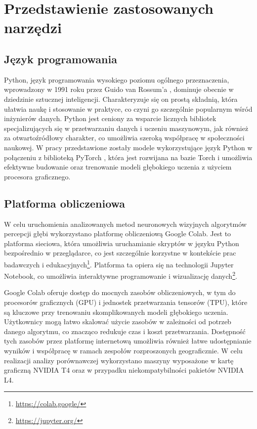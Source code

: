 \chapter{Przedstawienie zastosowanych narzędzi}\label{chap:przedstawienie_zastosowanych_narzędzi}

\section{Język programowania}
Python, język programowania wysokiego poziomu ogólnego przeznaczenia, wprowadzony w 1991 roku przez Guido van Rossum’a \cite{Python}, dominuje obecnie w dziedzinie sztucznej inteligencji. Charakteryzuje się on prostą składnią, która ułatwia naukę i stosowanie w praktyce, co czyni go szczególnie popularnym wśród inżynierów danych. Python jest ceniony za wsparcie licznych bibliotek specjalizujących się w przetwarzaniu danych i uczeniu maszynowym, jak również za otwartoźródłowy charakter, co umożliwia szeroką współpracę w społeczności naukowej. W pracy przedstawione zostały modele wykorzystujące język Python w połączeniu z biblioteką PyTorch \cite{paszke2019}, która jest rozwijana na bazie Torch i umożliwia efektywne budowanie oraz trenowanie modeli głębokiego uczenia z użyciem procesora graficznego.

\section{Platforma obliczeniowa}
W celu uruchomienia analizowanych metod neuronowych wizyjnych algorytmów percepcji głębi wykorzystano platformę obliczeniową Google Colab. Jest to platforma sieciowa, która umożliwia uruchamianie skryptów w języku Python bezpośrednio w przeglądarce, co jest szczególnie korzystne w kontekście prac badawczych i edukacyjnych\footnote{\href{https://colab.google/}{https://colab.google/}}. Platforma ta opiera się na technologii Jupyter Notebook, co umożliwia interaktywne programowanie i wizualizację danych\footnote{\href{https://jupyter.org/}{https://jupyter.org/}}.

Google Colab oferuje dostęp do mocnych zasobów obliczeniowych, w tym do procesorów graficznych (GPU) i jednostek przetwarzania tensorów (TPU), które są kluczowe przy trenowaniu skomplikowanych modeli głębokiego uczenia. Użytkownicy mogą łatwo skalować użycie zasobów w zależności od potrzeb danego algorytmu, co znacząco redukuje czas i koszt przetwarzania. Dostępność tych zasobów przez platformę internetową umożliwia również łatwe udostępnianie wyników i współpracę w ramach zespołów rozproszonych geograficznie. W celu realizacji analizy porównawczej wykorzystano maszyny wyposażone w kartę graficzną NVIDIA T4 oraz w przypadku niekompatybilności pakietów NVIDIA L4.

